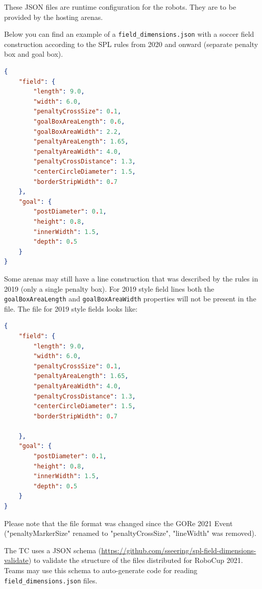 These JSON files are runtime configuration for the robots. They are to be provided by the hosting arenas.

Below you can find an example of a \texttt{field\_dimensions.json} with a soccer field construction according to the SPL rules from 2020 and onward (separate penalty box and goal box).

\begin{lstlisting}[language=json,firstnumber=1]
{
    "field": {
        "length": 9.0,
        "width": 6.0,
        "penaltyCrossSize": 0.1,
        "goalBoxAreaLength": 0.6,
        "goalBoxAreaWidth": 2.2,
        "penaltyAreaLength": 1.65,
        "penaltyAreaWidth": 4.0,
        "penaltyCrossDistance": 1.3,
        "centerCircleDiameter": 1.5,
        "borderStripWidth": 0.7
    },
    "goal": {
        "postDiameter": 0.1,
        "height": 0.8,
        "innerWidth": 1.5,
        "depth": 0.5
    }
}
\end{lstlisting}

Some arenas may still have a line construction that was described by the rules in 2019 (only a single penalty box). For 2019 style field lines both the \texttt{goalBoxAreaLength} and \texttt{goalBoxAreaWidth} properties will not be present in the file. The file for 2019 style fields looks like:

\begin{lstlisting}[language=json,firstnumber=1]
{
    "field": {
        "length": 9.0,
        "width": 6.0,
        "penaltyCrossSize": 0.1,
        "penaltyAreaLength": 1.65,
        "penaltyAreaWidth": 4.0,
        "penaltyCrossDistance": 1.3,
        "centerCircleDiameter": 1.5,
        "borderStripWidth": 0.7

    },
    "goal": {
        "postDiameter": 0.1,
        "height": 0.8,
        "innerWidth": 1.5,
        "depth": 0.5
    }
}
\end{lstlisting}

Please note that the file format was changed since the GORe 2021 Event ("penaltyMarkerSize" renamed to "penaltyCrossSize", "lineWidth" was removed).

The TC uses a JSON schema (\url{https://github.com/sseering/spl-field-dimensions-validate}) to validate the structure of the files distributed for RoboCup 2021. Teams may use this schema to auto-generate code for reading \texttt{field\_dimensions.json} files.

